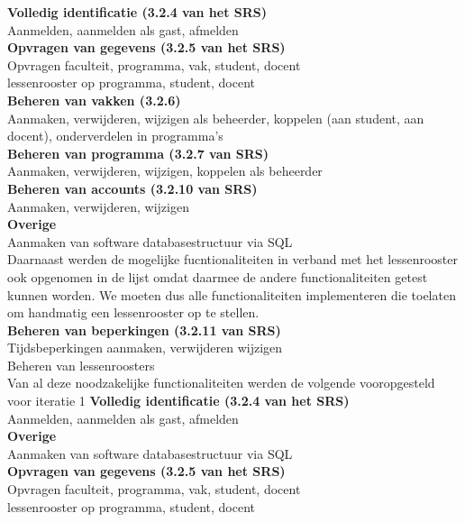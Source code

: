\documentclass{article}
\begin{document}
\textbf{Volledig identificatie (3.2.4 van het SRS) }\\
Aanmelden, aanmelden als gast, afmelden \\
\textbf{Opvragen van gegevens (3.2.5 van het SRS) }\\
Opvragen faculteit, programma, vak, student, docent \\
lessenrooster op programma, student, docent \\
\textbf{Beheren van vakken (3.2.6) } \\
Aanmaken, verwijderen, wijzigen als beheerder, koppelen (aan student, aan docent), onderverdelen in programma's \\
\textbf{Beheren van programma (3.2.7 van SRS)} \\
Aanmaken, verwijderen, wijzigen, koppelen als beheerder \\
\textbf{Beheren van accounts (3.2.10 van SRS)} \\
Aanmaken, verwijderen, wijzigen \\
\textbf{Overige} \\
Aanmaken van software databasestructuur via SQL \\[3mm]

Daarnaast werden de mogelijke fucntionaliteiten in verband met het lessenrooster ook opgenomen in de lijst omdat daarmee de andere functionaliteiten getest kunnen worden. We moeten dus alle functionaliteiten implementeren die toelaten om handmatig een lessenrooster op te stellen. \\[3mm]

\textbf{Beheren van beperkingen (3.2.11 van SRS) }  \\
Tijdsbeperkingen aanmaken, verwijderen wijzigen \\
Beheren van lessenroosters \\[3mm]

Van al deze noodzakelijke functionaliteiten werden de volgende vooropgesteld voor iteratie 1 
\textbf{Volledig identificatie (3.2.4 van het SRS) }\\
Aanmelden, aanmelden als gast, afmelden  \\
\textbf{Overige} \\
Aanmaken van software databasestructuur via SQL \\
\textbf{Opvragen van gegevens (3.2.5 van het SRS) } \\
Opvragen faculteit, programma, vak, student, docent \\
lessenrooster op programma, student, docent \\[3mm]
\end{document}
